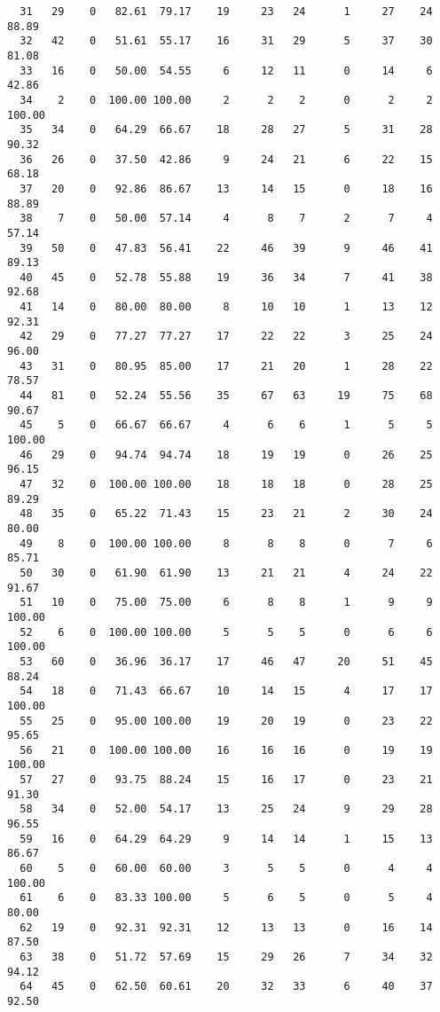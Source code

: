 \begin{verbatim}
  31   29    0   82.61  79.17    19     23   24      1     27    24    88.89
  32   42    0   51.61  55.17    16     31   29      5     37    30    81.08
  33   16    0   50.00  54.55     6     12   11      0     14     6    42.86
  34    2    0  100.00 100.00     2      2    2      0      2     2   100.00
  35   34    0   64.29  66.67    18     28   27      5     31    28    90.32
  36   26    0   37.50  42.86     9     24   21      6     22    15    68.18
  37   20    0   92.86  86.67    13     14   15      0     18    16    88.89
  38    7    0   50.00  57.14     4      8    7      2      7     4    57.14
  39   50    0   47.83  56.41    22     46   39      9     46    41    89.13
  40   45    0   52.78  55.88    19     36   34      7     41    38    92.68
  41   14    0   80.00  80.00     8     10   10      1     13    12    92.31
  42   29    0   77.27  77.27    17     22   22      3     25    24    96.00
  43   31    0   80.95  85.00    17     21   20      1     28    22    78.57
  44   81    0   52.24  55.56    35     67   63     19     75    68    90.67
  45    5    0   66.67  66.67     4      6    6      1      5     5   100.00
  46   29    0   94.74  94.74    18     19   19      0     26    25    96.15
  47   32    0  100.00 100.00    18     18   18      0     28    25    89.29
  48   35    0   65.22  71.43    15     23   21      2     30    24    80.00
  49    8    0  100.00 100.00     8      8    8      0      7     6    85.71
  50   30    0   61.90  61.90    13     21   21      4     24    22    91.67
  51   10    0   75.00  75.00     6      8    8      1      9     9   100.00
  52    6    0  100.00 100.00     5      5    5      0      6     6   100.00
  53   60    0   36.96  36.17    17     46   47     20     51    45    88.24
  54   18    0   71.43  66.67    10     14   15      4     17    17   100.00
  55   25    0   95.00 100.00    19     20   19      0     23    22    95.65
  56   21    0  100.00 100.00    16     16   16      0     19    19   100.00
  57   27    0   93.75  88.24    15     16   17      0     23    21    91.30
  58   34    0   52.00  54.17    13     25   24      9     29    28    96.55
  59   16    0   64.29  64.29     9     14   14      1     15    13    86.67
  60    5    0   60.00  60.00     3      5    5      0      4     4   100.00
  61    6    0   83.33 100.00     5      6    5      0      5     4    80.00
  62   19    0   92.31  92.31    12     13   13      0     16    14    87.50
  63   38    0   51.72  57.69    15     29   26      7     34    32    94.12
  64   45    0   62.50  60.61    20     32   33      6     40    37    92.50

\end{verbatim}
